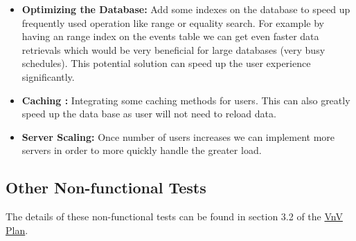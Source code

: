 \documentclass[12pt, titlepage]{article}
\begin{document}
\begin{itemize}
  \item \textbf{Optimizing the Database:} Add some indexes on the database to speed up frequently used operation like range or equality search. For example by having an range index on the events table we can get even faster data retrievals which would be very beneficial for large databases (very busy schedules). This potential solution can speed up the user experience significantly.
  \item \textbf{Caching :} Integrating some caching methods for users. This can also greatly speed up the data base as user will not need to reload data.
  \item \textbf{Server Scaling:} Once number of users increases we can implement more servers in order to more quickly handle the greater load.
\end{itemize}


\subsection{Other Non-functional Tests}

The details of these non-functional tests can be found in section 3.2 of the \href{https://github.com/DangJustin/CapstoneProject/blob/main/docs/VnVPlan/VnVPlan.pdf}{VnV Plan}.
\end{document}

